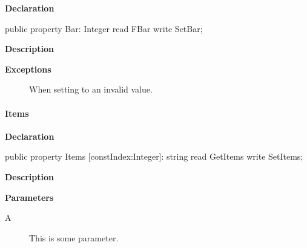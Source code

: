 \documentclass{report}
\begin{document}
\begin{list}{}{
\setlength{\itemindent}{0cm}
\setlength{\listparindent}{0cm}
\setlength{\leftmargin}{\evensidemargin}
\addtolength{\leftmargin}{\tmplength}
\settowidth{\labelsep}{X}
\addtolength{\leftmargin}{\labelsep}
\setlength{\labelwidth}{\tmplength}
}
\begin{flushleft}
\item[\textbf{Declaration}\hfill]
\begin{ttfamily}
public property Bar: Integer read FBar write SetBar;\end{ttfamily}


\end{flushleft}
\par
\item[\textbf{Description}]
 \par
\item[\textbf{Exceptions}]
\begin{description}
\item[\begin{ttfamily}TMyException\end{ttfamily}(\ref{A.TMyException})] When setting to an invalid value.
\end{description}


\end{list}
\paragraph*{Items}\hspace*{\fill}

\begin{list}{}{
\setlength{\itemindent}{0cm}
\setlength{\listparindent}{0cm}
\setlength{\leftmargin}{\evensidemargin}
\addtolength{\leftmargin}{\tmplength}
\settowidth{\labelsep}{X}
\addtolength{\leftmargin}{\labelsep}
\setlength{\labelwidth}{\tmplength}
}
\begin{flushleft}
\item[\textbf{Declaration}\hfill]
\begin{ttfamily}
public property Items [constIndex:Integer]: string read GetItems write SetItems;\end{ttfamily}


\end{flushleft}
\par
\item[\textbf{Description}]
 \par
\item[\textbf{Parameters}]
\begin{description}
\item[A] This is some parameter.
\end{description}


\end{list}
\end{document}
